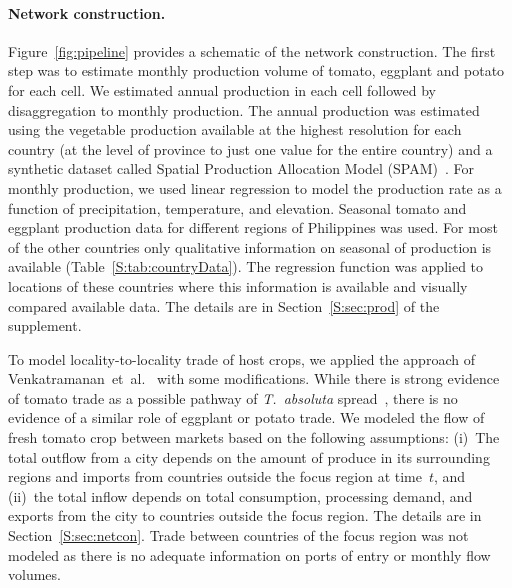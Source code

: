 \documentclass[11pt]{article}
\newcommand{\tuta}{\emph{T.~absoluta}}
\theoremstyle{definition}
\begin{document}
\paragraph{Network construction.} 
Figure~\ref{fig:pipeline} provides a schematic of the network construction.
The first step was to estimate monthly production volume of tomato,
eggplant and potato for each cell. We estimated annual production in each
cell followed by disaggregation to monthly production. The annual
production was estimated using the vegetable production available at the
highest resolution for each country (at the level of province to just one
value for the entire country) and a synthetic dataset called Spatial
Production Allocation Model (SPAM)~\cite{spam}. For monthly production, we
used linear regression to model the production rate as a function of
precipitation, temperature, and elevation. Seasonal tomato and eggplant
production data for different regions of Philippines was used. For most of
the other countries only qualitative information on seasonal of production
is available (Table~\ref{S:tab:countryData}). The regression function was
applied to locations of these countries where this information is
available and visually compared available data. The details are in
Section~\ref{S:sec:prod} of the supplement.

To model locality-to-locality trade of host crops, we applied the approach
of
Venkatramanan~et~al.~\cite{venkatramanan2017towards,venkatramanan2019modeling}
with some modifications. While there is strong evidence of tomato trade as
a possible pathway of \tuta{} spread~\cite{biondi2017}, there is no
evidence of a similar role of eggplant or potato trade.  We modeled the
flow of fresh tomato crop between markets based on the following
assumptions: (i)~The total outflow from a city depends on the amount of
produce in its surrounding regions and imports from countries outside the
focus region at time~$t$, and (ii)~the total inflow depends on total
consumption, processing demand, and exports from the city to countries
outside the focus region. The details are in Section~\ref{S:sec:netcon}.
Trade between countries of the focus
region was not modeled as there is no adequate information on ports of
entry or monthly flow volumes.
\end{document}
